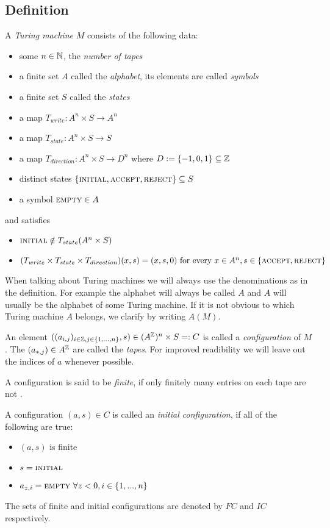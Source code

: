 \subsection{Definition}

\begin{Definition}
	A \emph{Turing machine} $M$ consists of the following data:
	\begin{itemize}
		\item{some $n \in \mathbb{N}$}, the \emph{number of tapes}
		\item{a finite set $A$ called the \emph{alphabet}, its elements are called \emph{symbols}}
		\item{a finite set $S$ called the \emph{states}}
		\item{a map $T_{write}: A^n \times S \to A^n$}
		\item{a map $T_{state}: A^n \times S \to S$}
		\item{a map $T_{direction}: A^n \times S \to D^n$ where $D := \{-1,0,1\} \subseteq \mathbb{Z}$}
		\item{distinct states $\{\text{\scshape{initial}},\text{\scshape{accept}},\text{\scshape{reject}}\} \subseteq S$}
		\item{a symbol $\text{\scshape{empty}} \in A$}
	\end{itemize}
	and satisfies
	\begin{itemize}
		\item{$\text{\scshape{initial}} \notin T_{state}(A^n \times S)$}
		\item{$(T_{write} \times T_{state} \times T_{direction}) (x,s) = (x,s,0) ~\text{for every}~ x \in A^n , s \in \{\text{\scshape{accept}},\text{\scshape{reject}}\}$}
	\end{itemize}
\end{Definition}
When talking about Turing machines we will always use the denominations as in the definition.
For example the alphabet will always be called $A$ and $A$ will usually be the alphabet of some Turing machine.
If it is not obvious to which Turing machine $A$ belongs, we clarify by writing $A(M)$.

An element $((a_{i,j})_{i \in \mathbb{Z}, j \in \{1,...,n\}},s) \in (A^{\mathbb{Z}})^n \times S =: C$ is called a \emph{configuration} of $M$. The $(a_{*,j}) \in A^{\mathbb{Z}}$ are called the \emph{tapes}.
For improved readibility we will leave out the indices of $a$ whenever possible.

A configuration is said to be \emph{finite}, if only finitely many entries on each tape are not \EMP.

A configuration $(a,s) \in C$ is called an \emph{initial configuration}, if all of the following are true:
\begin{itemize}
	\item{$(a,s)$ is finite}
	\item{$s = \text{\scshape{initial}}$}
	\item{$a_{z,i} = \text{\scshape{empty}}~\forall z < 0, i \in \{1,...,n\}$}
\end{itemize}
The sets of finite and initial configurations are denoted by $FC$ and $IC$ respectively.

